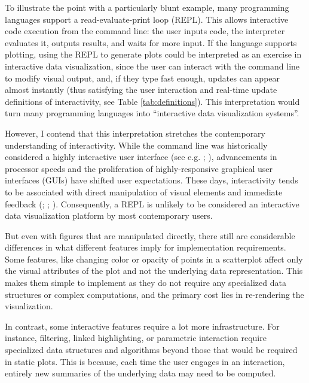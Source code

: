 \documentclass[
  openany]{book}
\theoremstyle{definition}
\theoremstyle{definition}
\theoremstyle{definition}
\theoremstyle{definition}
\theoremstyle{remark}
\begin{document}
To illustrate the point with a particularly blunt example, many programming languages support a read-evaluate-print loop (REPL). This allows interactive code execution from the command line: the user inputs code, the interpreter evaluates it, outputs results, and waits for more input. If the language supports plotting, using the REPL to generate plots could be interpreted as an exercise in interactive data visualization, since the user can interact with the command line to modify visual output, and, if they type fast enough, updates can appear almost instantly (thus satisfying the user interaction and real-time update definitions of interactivity, see Table \ref{tab:definitions}). This interpretation would turn many programming languages into ``interactive data visualization systems''.

However, I contend that this interpretation stretches the contemporary understanding of interactivity. While the command line was historically considered a highly interactive user interface (see e.g. ; ), advancements in processor speeds and the proliferation of highly-responsive graphical user interfaces (GUIs) have shifted user expectations. These days, interactivity tends to be associated with direct manipulation of visual elements and immediate feedback (; ; ). Consequently, a REPL is unlikely to be considered an interactive data visualization platform by most contemporary users.

But even with figures that are manipulated directly, there still are considerable differences in what different features imply for implementation requirements. Some features, like changing color or opacity of points in a scatterplot affect only the visual attributes of the plot and not the underlying data representation. This makes them simple to implement as they do not require any specialized data structures or complex computations, and the primary cost lies in re-rendering the visualization.

In contrast, some interactive features require a lot more infrastructure. For instance, filtering, linked highlighting, or parametric interaction require specialized data structures and algorithms beyond those that would be required in static plots. This is because, each time the user engages in an interaction, entirely new summaries of the underlying data may need to be computed.
\end{document}
